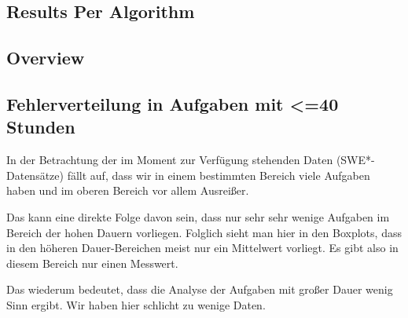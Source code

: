 \newpage{}

\begin{landscape}

\hypertarget{results-per-algorithm}{%
\section{Results Per Algorithm}\label{results-per-algorithm}}

\subsection{Overview}



\end{landscape}

\subsection{Fehlerverteilung in Aufgaben mit <=40 Stunden}

In der Betrachtung der im Moment zur Verfügung stehenden Daten (SWE*-Datensätze) fällt auf, dass
wir in einem bestimmten Bereich viele Aufgaben haben und im oberen Bereich vor allem Ausreißer. 

Das kann eine direkte Folge davon sein, dass nur sehr sehr wenige Aufgaben im Bereich der hohen Dauern 
vorliegen. Folglich sieht man hier in den Boxplots, dass in den höheren Dauer-Bereichen meist nur ein Mittelwert
vorliegt. Es gibt also in diesem Bereich nur einen Messwert. 

Das wiederum bedeutet, dass die Analyse der Aufgaben mit großer Dauer wenig Sinn ergibt. Wir haben hier
schlicht zu wenige Daten.

\newpage


